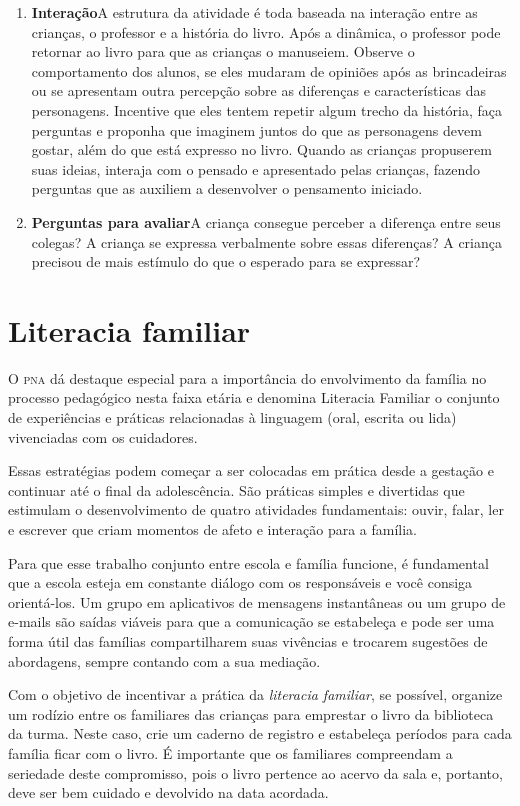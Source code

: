 \documentclass[11pt]{extarticle}
\begin{document}
\begin{enumerate}
\item \textbf{Interação}\quad A estrutura da atividade é toda baseada na interação entre as crianças, o professor e a história do livro. Após a dinâmica, o professor pode retornar ao livro para que as crianças o manuseiem. Observe o comportamento dos alunos, se eles mudaram de opiniões após as brincadeiras ou se apresentam outra percepção sobre as diferenças e características das personagens. Incentive que eles tentem repetir algum trecho da história,
faça perguntas e proponha que imaginem juntos do que as personagens devem gostar, além do que está expresso no livro. Quando as crianças propuserem suas ideias, interaja com o pensado e apresentado pelas crianças, fazendo perguntas que as auxiliem a desenvolver o pensamento iniciado.

\item \textbf{Perguntas para avaliar}\quad A criança consegue perceber a diferença entre seus colegas? A criança se expressa verbalmente sobre essas diferenças? A criança precisou de mais estímulo do que o esperado para se expressar?
\end{enumerate}


\section{Literacia familiar}
O \textsc{pna} dá destaque especial para a importância do envolvimento da família 
no processo pedagógico nesta faixa etária e denomina Literacia Familiar o conjunto 
de experiências e práticas relacionadas à linguagem (oral, escrita ou lida) vivenciadas 
com os cuidadores. 

Essas estratégias podem começar a ser colocadas em prática desde a 
gestação e continuar até o final da adolescência. São práticas simples e divertidas 
que estimulam o desenvolvimento de quatro atividades fundamentais: ouvir, falar, 
ler e escrever que criam momentos de afeto e interação para a família. 

Para que esse trabalho conjunto entre escola e família funcione, é 
fundamental que a escola esteja em constante diálogo com os responsáveis e 
você consiga orientá-los. Um grupo em aplicativos de mensagens instantâneas ou um 
grupo de e-mails são saídas viáveis para que a comunicação se estabeleça e pode ser 
uma forma útil das famílias compartilharem suas vivências e trocarem sugestões 
de abordagens, sempre contando com a sua mediação. 

Com o objetivo de incentivar 
a prática da \textit{literacia familiar}, se possível, organize um rodízio entre os familiares 
das crianças para emprestar o livro da biblioteca da turma. Neste caso, crie um caderno 
de registro e estabeleça períodos para cada família ficar com o livro. É importante 
que os familiares compreendam a seriedade deste compromisso, pois o livro pertence 
ao acervo da sala e, portanto, deve ser bem cuidado e devolvido na data acordada. 
\end{document}
